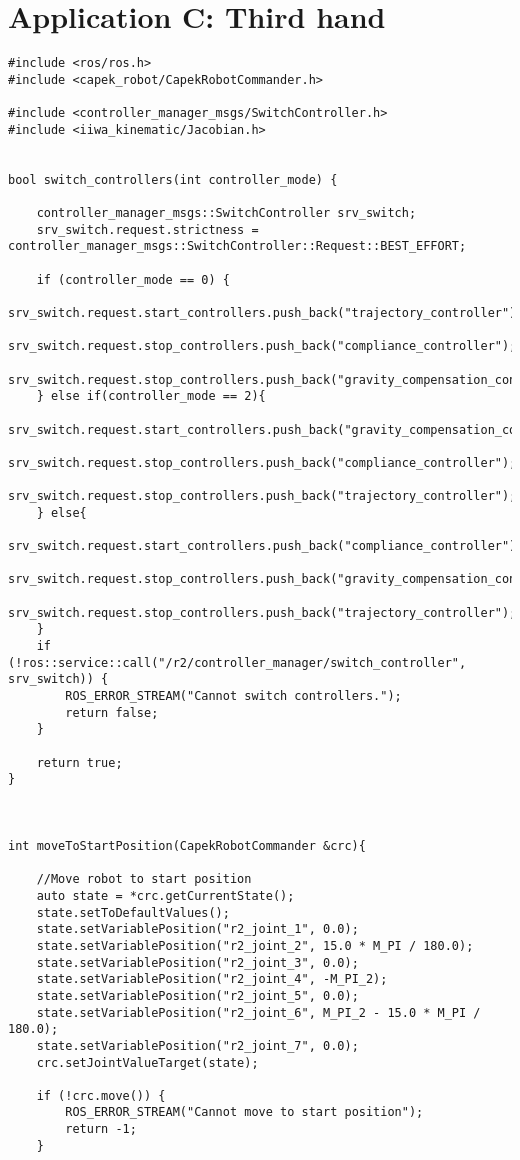 \chapter{Application C: Third hand}
\begin{lstlisting}
#include <ros/ros.h>
#include <capek_robot/CapekRobotCommander.h>

#include <controller_manager_msgs/SwitchController.h>
#include <iiwa_kinematic/Jacobian.h>


bool switch_controllers(int controller_mode) {

	controller_manager_msgs::SwitchController srv_switch;
	srv_switch.request.strictness = controller_manager_msgs::SwitchController::Request::BEST_EFFORT;

	if (controller_mode == 0) {
		srv_switch.request.start_controllers.push_back("trajectory_controller");
		srv_switch.request.stop_controllers.push_back("compliance_controller");
		srv_switch.request.stop_controllers.push_back("gravity_compensation_controller");
	} else if(controller_mode == 2){
		srv_switch.request.start_controllers.push_back("gravity_compensation_controller");
		srv_switch.request.stop_controllers.push_back("compliance_controller");
		srv_switch.request.stop_controllers.push_back("trajectory_controller");
	} else{
		srv_switch.request.start_controllers.push_back("compliance_controller");
		srv_switch.request.stop_controllers.push_back("gravity_compensation_controller");
		srv_switch.request.stop_controllers.push_back("trajectory_controller");
	}
	if (!ros::service::call("/r2/controller_manager/switch_controller", srv_switch)) {
		ROS_ERROR_STREAM("Cannot switch controllers.");
		return false;
	}

	return true;
}



int moveToStartPosition(CapekRobotCommander &crc){

	//Move robot to start position
	auto state = *crc.getCurrentState();
	state.setToDefaultValues();
	state.setVariablePosition("r2_joint_1", 0.0);
	state.setVariablePosition("r2_joint_2", 15.0 * M_PI / 180.0);
	state.setVariablePosition("r2_joint_3", 0.0);
	state.setVariablePosition("r2_joint_4", -M_PI_2);
	state.setVariablePosition("r2_joint_5", 0.0);
	state.setVariablePosition("r2_joint_6", M_PI_2 - 15.0 * M_PI / 180.0);
	state.setVariablePosition("r2_joint_7", 0.0);
	crc.setJointValueTarget(state);

	if (!crc.move()) {
		ROS_ERROR_STREAM("Cannot move to start position");
		return -1;
	}


\end{lstlisting}
